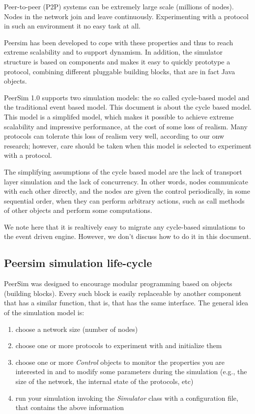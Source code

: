 \documentclass[a4paper,11pt]{article}
\begin{document}
Peer-to-peer (P2P) systems can be extremely large
scale (millions of nodes).
Nodes in the network join and leave continuously.
Experimenting with a protocol in such an environment it no easy task at all.

Peersim has been developed to cope with these properties and thus
to reach extreme scalability and to support dynamism. In addition,
the simulator structure is based on components and makes it easy to quickly
prototype a protocol, combining different pluggable building
blocks, that are in fact Java objects.

PeerSim 1.0 supports two simulation models: the so called cycle-based model
and the traditional event based model.
This document is about the cycle based model.
This model is a simplifed model, which makes it possible to achieve extreme
scalability and impressive performance, at the cost of some loss of realism.
Many protocols can tolerate this loss of realism very well, according to
our onw research; however,
care should be taken when this model is selected to experiment with a protocol.

The simplifying assumptions of the cycle based model are the lack of
transport layer simulation and the lack of concurrency.
In other words, nodes communicate with each other directly, and the nodes
are given the control periodically, in some sequential order, when they can
perform arbitrary actions, such as call methods of other objects and perform
some computations.

We note here that it is realtively easy to migrate any cycle-based simulations
to the event driven engine. However, we don't discuss how to do it in this
document.

\subsection{Peersim simulation life-cycle}

PeerSim was designed to encourage modular programming based on objects
(building blocks). Every such block is easily replaceable by another component
that has a similar function, that is, that  has the same interface.
The general idea of the simulation model is:

\begin{enumerate}
\item choose a network size (number of nodes) 
\item choose one or more protocols to experiment with and initialize
them
\item choose one or more \emph{Control} objects
  to monitor the properties
  you are interested in and to modify some parameters during
  the simulation (e.g., the size of the
 network, the internal state of the protocols, etc) 
\item run your simulation invoking the \emph{Simulator} class with a
configuration file, that contains the above information
\end{enumerate}
\end{document}
